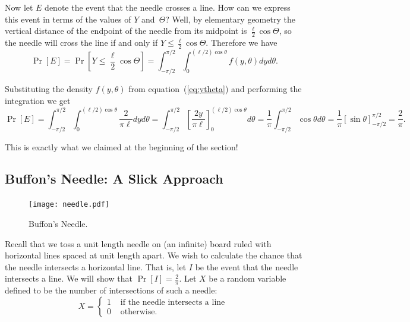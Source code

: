\documentclass[11pt]{article}
\begin{document}
Now let $E$ denote the event that the needle crosses a line.  How can we
express this event in terms of the values of $Y$ and~$\Theta$?  Well, by
elementary geometry the vertical distance of the endpoint of the needle from
its midpoint is $\frac{\ell}{2}\cos\Theta$, so the needle will cross
the line if and only if $Y\le \frac{\ell}{2}\cos\Theta$.  Therefore we have $$
   \Pr[E] = \Pr[Y \le {\textstyle\frac{\ell}{2}}\cos\Theta] =
\int_{-\pi/2}^{\pi/2}\int_0^{(\ell/2)\cos\theta}
f(y,\theta)dyd\theta.
$$

Substituting the density $f(y,\theta)$ from equation~(\ref{eq:ytheta}) and performing
the integration we get
\begin{equation*}
    \Pr[E] = \int_{-\pi/2}^{\pi/2}\int_0^{(\ell/2)\cos\theta} \frac{2}{\pi\ell} dyd\theta
               = \int_{-\pi/2}^{\pi/2} \left[\frac{2y}{\pi\ell}\right]_0^{(\ell/2)\cos\theta}d\theta
               = \frac{1}{\pi}\int_{-\pi/2}^{\pi/2} \cos\theta d\theta
               = \frac{1}{\pi}\left[\sin\theta\right]_{-\pi/2}^{\pi/2}
               = \frac{2}{\pi}.
\end{equation*}

This is exactly what we claimed at the beginning of the section!

\subsection*{Buffon's Needle: A Slick Approach}

\begin{figure}[h]
\begin{center}
\texttt{[image: needle.pdf]}
\end{center}
\caption{Buffon's Needle.}
\label{fig:needle}
\end{figure}



Recall that we toss a unit length needle on (an infinite) board ruled with horizontal
lines spaced at unit length apart.  We wish to calculate
the chance that the needle intersects a horizontal line.  That is, let $I$ be the event that
the needle intersects a line.  We will show that $\Pr[I] = \frac{2}{\pi}$.  Let
$X$ be a random variable defined to be the number of intersections of such a needle:
$$X = \left\{ \begin{array}{cc}
1&\mbox{ if the needle intersects a line }\\
0&\mbox{ otherwise. }
\end{array}\right.$$
\end{document}
